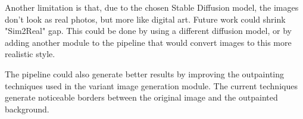 Another limitation is that, due to the chosen Stable Diffusion model, the
images don't look as real photos, but more like digital art. Future work could
shrink "Sim2Real" gap. This could be done by using a different diffusion model,
or by adding another module to the pipeline that would convert images to this
more realistic style.

The pipeline could also generate better results by improving the outpainting
techniques used in the variant image generation module. The current techniques
generate noticeable borders between the original image and the outpainted
background.


